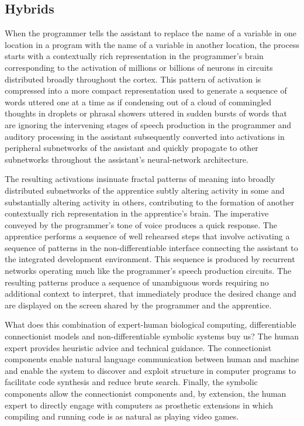 
\subsection{Hybrids}

When the programmer tells the assistant to replace the name of a variable in one location in a program with the name of a variable in another location, the process starts with a contextually rich representation in the programmer's brain corresponding to the activation of millions or billions of neurons in circuits distributed broadly throughout the cortex. This pattern of activation is compressed into a more compact representation used to generate a sequence of words uttered one at a time as if condensing out of a cloud of commingled thoughts in droplets or phrasal showers uttered in sudden bursts of words that are \emdash{} ignoring the intervening stages of speech production in the programmer and auditory processing in the assistant \emdash{} subsequently converted into activations in peripheral subnetworks of the assistant and quickly propagate to other subnetworks throughout the assistant's neural-network architecture. 

The resulting activations insinuate fractal patterns of meaning into broadly distributed subnetworks of the apprentice subtly altering activity in some and substantially altering activity in others, contributing to the formation of another contextually rich representation in the apprentice's brain. The imperative conveyed by the programmer's tone of voice produces a quick response. The apprentice performs a sequence of well rehearsed steps that involve activating a sequence of patterns in the non-differentiable interface connecting the assistant to the integrated development environment. This sequence is produced by recurrent networks operating much like the programmer's speech production circuits. The resulting patterns produce a sequence of unambiguous words \emdash{} requiring no additional context to interpret, that immediately produce the desired change and are displayed on the screen shared by the programmer and the apprentice.

What does this combination of expert-human biological computing, differentiable connectionist models and non-differentiable symbolic systems buy us? The human expert provides heuristic advice and technical guidance. The connectionist components enable natural language communication between human and machine and enable the system to discover and exploit structure in computer programs to facilitate code synthesis and reduce brute search. Finally, the symbolic components allow the connectionist components \emdash{} and, by extension, the human expert \emdash{} to directly engage with computers as prosthetic extensions in which compiling and running code is as natural as playing video games.

